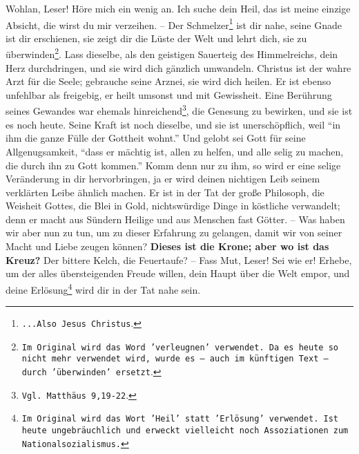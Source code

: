 Wohlan, Leser! Höre mich ein wenig an. Ich suche dein Heil, das ist meine
einzige Absicht, die wirst du mir verzeihen. -- Der
Schmelzer\footnote{\texttt{...Also
Jesus Christus}.} ist dir nahe, seine Gnade ist dir erschienen, sie zeigt dir die
Lüste der Welt und lehrt dich, sie zu überwinden\footnote{\texttt{Im Original
wird das
Word 'verleugnen' verwendet. Da es heute so nicht mehr verwendet wird, wurde
es -- auch im künftigen Text -- durch 'überwinden' ersetzt}.}. Lass dieselbe,
als den geistigen Sauerteig des Himmelreichs, dein Herz durchdringen, und sie
wird dich gänzlich umwandeln. Christus ist der wahre Arzt für die Seele;
gebrauche seine Arznei, sie wird dich heilen. Er ist ebenso unfehlbar als
freigebig, er heilt umsonst und mit Gewissheit. Eine Berührung seines Gewandes
war ehemals hinreichend\footnote{\texttt{Vgl. Matthäus 9,19-22}.}, die Genesung
zu
bewirken, und sie ist es noch heute. Seine Kraft ist noch dieselbe, und sie ist
unerschöpflich, weil "`in ihm die ganze Fülle der Gottheit wohnt."' Und gelobt
sei Gott für seine Allgenugsamkeit, "`dass er mächtig ist, allen zu helfen, und
alle selig zu machen, die durch ihn zu Gott kommen."' Komm denn nur zu ihm, so
wird er eine selige Veränderung in dir hervorbringen, ja er wird deinen
nichtigen Leib seinem verklärten Leibe ähnlich machen. Er ist in der Tat der
große Philosoph, die Weisheit Gottes, die Blei in Gold, nichtswürdige Dinge in
köstliche verwandelt; denn er macht aus Sündern Heilige und aus Menschen fast
Götter. -- Was haben wir aber nun zu tun, um zu dieser Erfahrung zu gelangen,
damit wir von seiner Macht und Liebe zeugen können? 
 \textbf{Dieses ist die
Krone; aber wo ist das Kreuz?} Der bittere Kelch, die Feuertaufe? -- Fass Mut,
Leser! Sei wie er! Erhebe, um der alles übersteigenden Freude willen, dein Haupt
über die Welt empor, und deine Erlösung\footnote{\texttt{Im Original wird das
Wort
'Heil' statt 'Erlösung' verwendet. Ist heute ungebräuchlich und erweckt
vielleicht noch Assoziationen zum Nationalsozialismus.}} wird dir in der Tat
nahe sein.

\medskip

